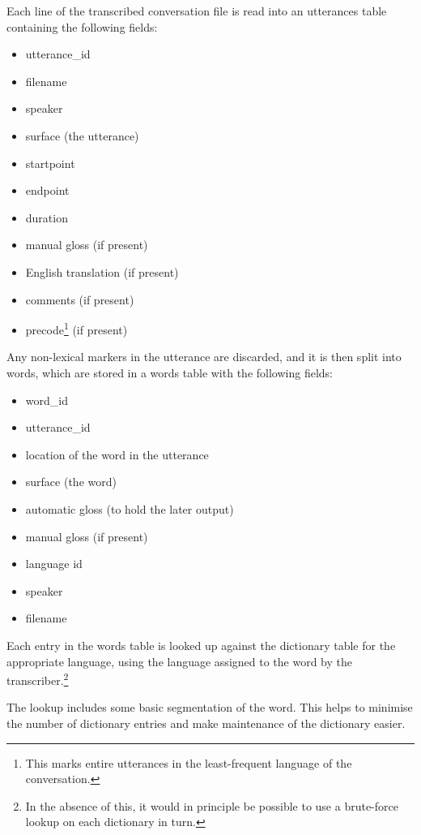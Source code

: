 \documentclass[11pt]{article}
\begin{document}
Each line of the transcribed conversation file is read into an utterances table containing the following fields:
\vspace{-3mm}
\begin{itemize}
\setlength{\itemsep}{-2mm}
\item utterance\_id
\item filename
\item speaker
\item surface (the utterance)
\item startpoint
\item endpoint
\item duration
\item manual gloss (if present)
\item English translation (if present)
\item comments (if present)
\item precode\footnote{This marks entire utterances in the least-frequent language of the conversation.} (if present)
\end{itemize}

Any non-lexical markers in the utterance are discarded, and it is then split into words, which are stored in a words table with the following fields:
\vspace{-3mm}
\begin{itemize}
\setlength{\itemsep}{-2mm}
\item word\_id
\item utterance\_id
\item location of the word in the utterance
\item surface (the word)
\item automatic gloss (to hold the later output)
\item manual gloss (if present)
\item language id
\item speaker
\item filename
\end{itemize}

Each entry in the words table is looked up against the dictionary table for the appropriate language, using the language assigned to the word by the transcriber.\footnote{In the absence of this, it would in principle be possible to use a brute-force lookup on each dictionary in turn.}

The lookup includes some basic segmentation of the word.  This helps to minimise the number of dictionary entries and make maintenance of the dictionary easier.
\end{document}
